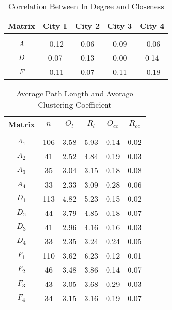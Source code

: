 \documentclass[11pt]{article}
\begin{document}
\begin{table}[ht]
\caption{Correlation Between In Degree and Closeness}
\centering
\begin{tabular}{ccccc}
\\[-1.8ex] \hline\hline
Matrix & City 1 & City 2 & City 3 & City 4\\
\hline \\[-1.8ex] 
$A$ & -0.12 & 0.06 & 0.09 & -0.06\\
$D$ & 0.07 & 0.13 & 0.00 & 0.14\\
$F$ & -0.11 & 0.07 & 0.11 & -0.18\\
\hline
\end{tabular}
\end{table}

\begin{table}[ht]
\caption{Average Path Length and Average Clustering Coefficient}
\centering
\begin{tabular}{c|c|cc|cc}
\\[-1.8ex] \hline\hline
Matrix & $n$ & $O_l$ & $R_l$ & $O_{cc}$ & $R_{cc}$\\
\hline \\[-1.8ex] 

$A_1$ & 106 & 3.58 & 5.93 & 0.14 & 0.02\\
$A_2$ & 41 & 2.52 & 4.84 & 0.19 & 0.03\\
$A_3$ & 35 & 3.04 & 3.15 & 0.18 & 0.08\\
$A_4$ & 33 & 2.33 & 3.09 & 0.28 & 0.06\\

$D_1$ & 113 & 4.82 & 5.23 & 0.15 & 0.02\\
$D_2$ & 44 & 3.79 & 4.85 & 0.18 & 0.07\\
$D_3$ & 41 & 2.96 & 4.16 & 0.16 & 0.03\\
$D_4$ & 33 & 2.35 & 3.24 & 0.24 & 0.05\\

$F_1$ & 110 & 3.62 & 6.23 & 0.12 & 0.01\\
$F_2$ & 46 & 3.48 & 3.86 & 0.14 & 0.07\\
$F_3$ & 43 & 3.05 & 3.68 & 0.29 & 0.03\\
$F_4$ & 34 & 3.15 & 3.16 & 0.19 & 0.07\\

\hline
\end{tabular}
\end{table}
\end{document}
